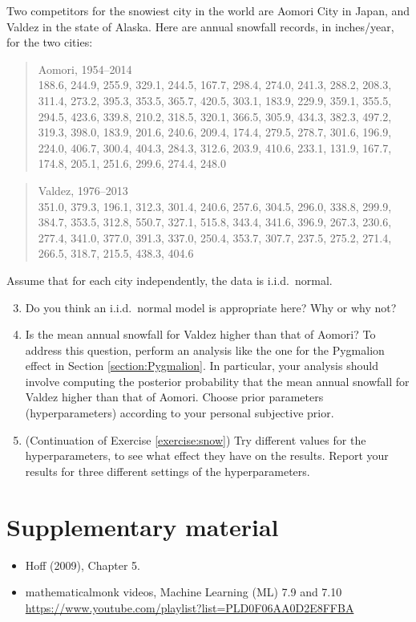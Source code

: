 \documentclass[12pt]{article}
\begin{document}
Two competitors for the snowiest city in the world are Aomori City in Japan, and Valdez in the state of Alaska. Here are annual snowfall records, in inches/year, for the two cities: 
\begin{quote}
Aomori, 1954--2014 \\
188.6, 244.9, 255.9, 329.1, 244.5, 167.7, 298.4, 274.0, 241.3, 288.2, 208.3, 311.4, 273.2, 395.3, 353.5, 365.7, 420.5, 303.1, 183.9, 229.9, 359.1, 355.5, 294.5, 423.6, 339.8, 210.2, 318.5, 320.1, 366.5, 305.9, 434.3, 382.3, 497.2, 319.3, 398.0, 183.9, 201.6, 240.6, 209.4, 174.4, 279.5, 278.7, 301.6, 196.9, 224.0, 406.7, 300.4, 404.3, 284.3, 312.6, 203.9, 410.6, 233.1, 131.9, 167.7, 174.8, 205.1, 251.6, 299.6, 274.4, 248.0
\end{quote}
\begin{quote}
Valdez, 1976--2013 \\
351.0, 379.3, 196.1, 312.3, 301.4, 240.6, 257.6, 304.5, 296.0, 338.8, 299.9, 384.7, 353.5, 312.8, 550.7, 327.1, 515.8, 343.4, 341.6, 396.9, 267.3, 230.6, 277.4, 341.0, 377.0, 391.3, 337.0, 250.4, 353.7, 307.7, 237.5, 275.2, 271.4, 266.5, 318.7, 215.5, 438.3, 404.6
\end{quote}
Assume that for each city independently, the data is i.i.d.\ normal.
\begin{enumerate}
\setcounter{enumi}{2}
\item Do you think an i.i.d.\ normal model is appropriate here? Why or why not?
\item \label{exercise:snow} Is the mean annual snowfall for Valdez higher than that of Aomori?
To address this question, perform an analysis like the one for the Pygmalion effect in Section \ref{section:Pygmalion}. In particular, your analysis should involve computing the posterior probability that the mean annual snowfall for Valdez higher than that of Aomori. Choose prior parameters (hyperparameters) according to your personal subjective prior.
\item (Continuation of Exercise \ref{exercise:snow}) Try different values for the hyperparameters, to see what effect they have on the results. Report your results for three different settings of the hyperparameters.
\end{enumerate}





\section*{Supplementary material}
\begin{itemize}
\item Hoff (2009), Chapter 5.
\item mathematicalmonk videos, Machine Learning (ML) 7.9 and 7.10 \\ 
    \url{https://www.youtube.com/playlist?list=PLD0F06AA0D2E8FFBA}
\end{itemize}
\end{document}

